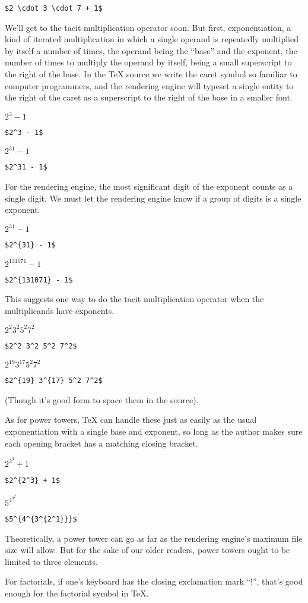 \verb=$2 \cdot 3 \cdot 7 + 1$=

We'll get to the tacit multiplication operator soon. But first, exponentiation, a kind of iterated multiplication in which a single operand is repeatedly multiplied by itself a number of times, the operand being the ``base'' and the exponent, the number of times to multiply the operand by itself, being a small superscript to the right of the base. In the \TeX{} source we write the caret symbol so familiar to computer programmers, and the rendering engine will typeset a single entity to the right of the caret as a superscript to the right of the base in a smaller font.

$2^3 - 1$

\verb=$2^3 - 1$=

$2^31 - 1$

\verb=$2^31 - 1$=

For the rendering engine, the most significant digit of the exponent counts as a single digit. We must let the rendering engine know if a group of digits is a single exponent.

$2^{31} - 1$

\verb=$2^{31} - 1$=

$2^{131071} - 1$

\verb=$2^{131071} - 1$=

This suggests one way to do the tacit multiplication operator when the multiplicands have exponents.

$2^2 3^2 5^2 7^2$

\verb=$2^2 3^2 5^2 7^2$=

$2^{19} 3^{17} 5^2 7^2$

\verb=$2^{19} 3^{17} 5^2 7^2$=

(Though it's good form to space them in the source).

As for power towers, \TeX{} can handle these just as easily as the usual exponentiation with a single base and exponent, so long as the author makes sure each opening bracket has a matching closing bracket.

$2^{2^3} + 1$

\verb=$2^{2^3} + 1$=

$5^{4^{3^{2^1}}}$

\verb=$5^{4^{3^{2^1}}}$=

Theoretically, a power tower can go as far as the rendering engine's maximum file size will allow. But for the sake of our older readers, power towers ought to be limited to three elements.

For factorials, if one's keyboard has the closing exclamation mark ``!'', that's good enough for the factorial symbol in \TeX{}.

